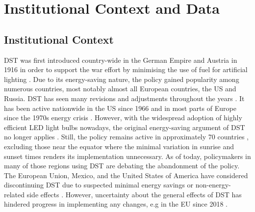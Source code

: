 \section{Institutional Context and Data}
\subsection{Institutional Context}
\ac{DST} was first introduced country-wide in the German Empire and Austria in 1916 in order to support the war effort by minimising the use of fuel for artificial lighting \parencite{Reichsgesetzblatt}. Due to its energy-saving nature, the policy gained popularity among numerous countries, most notably almost all European countries, the US and Russia. \ac{DST} has seen many revisions and adjustments throughout the years \parencite{prerau_book}. It has been active nationwide in the US since 1966 \parencite{Uniform} and in most parts of Europe since the 1970s energy crisis \parencite{pearce_great_2017}.  
However, with the widespread adoption of highly efficient LED light bulbs nowadays, the original energy-saving argument of \ac{DST} no longer applies \parencite{aries_effect_2008}.
Still, the policy remains active in approximately 70 countries \parencite{prerau_book}, excluding those near the equator where the minimal variation in sunrise and sunset times renders its implementation unnecessary. As of today, policymakers in many of those regions using \ac{DST} are debating the abandonment of the policy. The European Union, Mexico, and the United States of America have considered discontinuing DST due to suspected minimal energy savings or non-energy-related side effects \parencite{guven, mexico_congress, congress}. However, uncertainty about the general effects of DST has hindered progress in implementing any changes, e.g in the EU since 2018 \parencite{eu_directive}.
\newline
